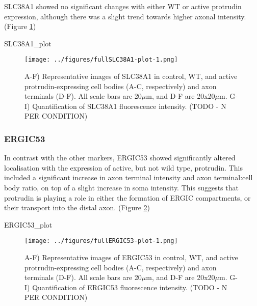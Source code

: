 \documentclass[
  12pt,
  a4paper,
]{book}
\newenvironment{Shaded}{\begin{snugshade}}{\end{snugshade}}
\newcommand{\NormalTok}[1]{#1}
\begin{document}
SLC38A1 showed no significant changes with either WT or active protrudin expression, although there was a slight trend towards higher axonal intensity. (Figure \ref{fig:SLC38A1-plot})

\begin{Shaded}
\begin{Highlighting}[]
\NormalTok{SLC38A1\_plot}
\end{Highlighting}
\end{Shaded}

\begin{figure}
\centering
\texttt{[image: ../figures/fullSLC38A1-plot-1.png]}
\caption{\label{fig:SLC38A1-plot}A-F) Representative images of SLC38A1 in control, WT, and active protrudin-expressing cell bodies (A-C, respectively) and axon terminals (D-F). All scale bars are 20\(\mu\)m, and D-F are 20x20\(\mu\)m. G-I) Quantification of SLC38A1 fluorescence intensity. (TODO - N PER CONDITION)}
\end{figure}

\hypertarget{ergic53}{%
\subsubsection{ERGIC53}\label{ergic53}}

In contrast with the other markers, ERGIC53 showed significantly altered localisation with the expression of active, but not wild type, protrudin. This included a significant increase in axon terminal intensity and axon terminal:cell body ratio, on top of a slight increase in soma intensity. This suggests that protrudin is playing a role in either the formation of ERGIC compartments, or their transport into the distal axon. (Figure \ref{fig:ERGIC53-plot})

\begin{Shaded}
\begin{Highlighting}[]
\NormalTok{ERGIC53\_plot}
\end{Highlighting}
\end{Shaded}

\begin{figure}
\centering
\texttt{[image: ../figures/fullERGIC53-plot-1.png]}
\caption{\label{fig:ERGIC53-plot}A-F) Representative images of ERGIC53 in control, WT, and active protrudin-expressing cell bodies (A-C, respectively) and axon terminals (D-F). All scale bars are 20\(\mu\)m, and D-F are 20x20\(\mu\)m. G-I) Quantification of ERGIC53 fluorescence intensity. (TODO - N PER CONDITION)}
\end{figure}
\end{document}
